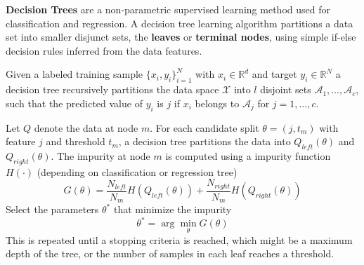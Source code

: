 \documentclass[11pt]{article}
\theoremstyle{plain}
\theoremstyle{definition}
\begin{document}
\textbf{Decision Trees} are a non-parametric supervised learning method used for classification and regression. A decision tree learning algorithm partitions a data set into smaller disjunct sets, the \textbf{leaves} or \textbf{terminal nodes}, using simple if-else decision rules inferred from the data features.

Given a labeled training sample $\{x_i,y_i\}_{i=1}^N$ with $x_i \in \mathbb{R}^d$ and target $y_i \in \mathbb{R}^N$ a decision tree recursively partitions the data space $\mathcal{X}$ into $l$ disjoint sets $\mathcal{A}_1, \dots,\mathcal{A}_c$, such that the predicted value of $y_i$ is $j$ if $x_i$ belongs to $\mathcal{A}_j$ for $j = 1, \dots, c$.

Let $Q$ denote the data at node $m$. For each candidate split $\theta=(j,t_m)$ with feature $j$ and threshold $t_m$, a decision tree partitions the data into $Q_{left}(\theta)$ and $Q_{right}(\theta)$. The impurity at node $m$ is computed using a impurity function $H(\cdot)$ (depending on classification or regression tree)
\begin{equation}
G(\theta) = \frac{N_{left}}{N_m}H(Q_{left}(\theta)) + \frac{N_{right}}{N_m}H(Q_{right}(\theta)) 
\end{equation}
Select the parameters $\theta^*$ that minimize the impurity
\begin{equation}
\theta^* = \arg\min_\theta G(\theta)
\end{equation}
This is repeated until a stopping criteria is reached, which might be a maximum depth of the tree, or the number of samples in each leaf reaches a threshold.
\end{document}
